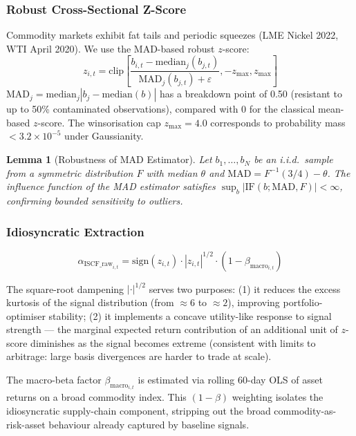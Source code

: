\documentclass[11pt]{article}
\newtheorem{lemma}{Lemma}
\begin{document}
\subsubsection{Robust Cross-Sectional Z-Score}

Commodity markets exhibit fat tails and periodic squeezes (LME Nickel 2022, WTI April 2020). We use the MAD-based robust $z$-score:
\begin{equation}
z_{i,t} = \text{clip}\left[\frac{b_{i,t} - \text{median}_j(b_{j,t})}{\text{MAD}_j(b_{j,t}) + \varepsilon}, -z_{\max}, z_{\max}\right]
\label{eq:mad-zscore}
\end{equation}
$\text{MAD}_j = \text{median}_j|b_j - \text{median}(b)|$ has a breakdown point of 0.50 (resistant to up to 50\% contaminated observations), compared with 0 for the classical mean-based $z$-score. The winsorisation cap $z_{\max} = 4.0$ corresponds to probability mass $< 3.2 \times 10^{-5}$ under Gaussianity.

\begin{lemma}[Robustness of MAD Estimator]
Let $b_1, \ldots, b_N$ be an i.i.d.\ sample from a symmetric distribution $F$ with median $\theta$ and $\text{MAD} = F^{-1}(3/4) - \theta$. The influence function of the MAD estimator satisfies $\sup_b |\text{IF}(b; \text{MAD}, F)| < \infty$, confirming bounded sensitivity to outliers.
\end{lemma}

\subsubsection{Idiosyncratic Extraction}

\begin{equation}
\alpha_{\text{ISCF\_raw}_{i,t}} = \text{sign}(z_{i,t}) \cdot |z_{i,t}|^{1/2} \cdot (1 - \beta_{\text{macro}_{i,t}})
\label{eq:iscf-raw}
\end{equation}

The square-root dampening $|\cdot|^{1/2}$ serves two purposes: (1) it reduces the excess kurtosis of the signal distribution (from $\approx 6$ to $\approx 2$), improving portfolio-optimiser stability; (2) it implements a concave utility-like response to signal strength --- the marginal expected return contribution of an additional unit of $z$-score diminishes as the signal becomes extreme (consistent with limits to arbitrage: large basis divergences are harder to trade at scale).

The macro-beta factor $\beta_{\text{macro}_{i,t}}$ is estimated via rolling 60-day OLS of asset returns on a broad commodity index. This $(1-\beta)$ weighting isolates the idiosyncratic supply-chain component, stripping out the broad commodity-as-risk-asset behaviour already captured by baseline signals.
\end{document}
